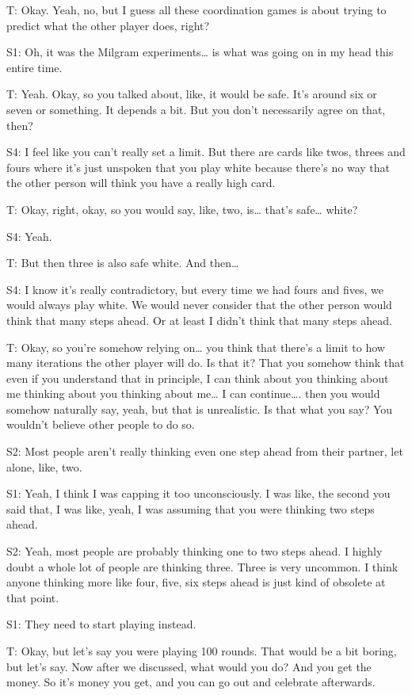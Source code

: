 T: Okay. Yeah, no, but I guess all these coordination games is about trying to predict what the other player does, right? 

S1: Oh, it was the Milgram experiments… is what was going on in my head this entire time.

T: Yeah. Okay, so you talked about, like, it would be safe. It's around six or seven or something. It depends a bit. But you don't necessarily agree on that, then?

S4: I feel like you can't really set a limit. But there are cards like twos, threes and fours where it's just unspoken that you play white because there's no way that the other person will think you have a really high card.

T: Okay, right, okay, so you would say, like, two, is… that's safe… white? 

S4: Yeah. 

T: But then three is also safe white. And then…

S4: I know it's really contradictory, but every time we had fours and fives, we would always play white. We would never consider that the other person would think that many steps ahead. Or at least I didn't think that many steps ahead. 

T:  Okay, so you're somehow relying on… you think that there's a limit to how many iterations the other player will do. Is that it? That you somehow think that even if you understand that in principle, I can think about you thinking about me thinking about you thinking about me… I can continue…. then you would somehow naturally say, yeah, but that is unrealistic. Is that what you say? You wouldn't believe other people to do so.

S2: Most people aren't really thinking even one step ahead from their partner, let alone, like, two. 

S1: Yeah, I think I was capping it too unconsciously. I was like, the second you said that, I was like, yeah, I was assuming that you were thinking two steps ahead.

S2: Yeah, most people are probably thinking one to two steps ahead. I highly doubt a whole lot of people are thinking three. Three is very uncommon. I think anyone thinking more like four, five, six steps ahead is just kind of obsolete at that point. 

S1: They need to start playing instead. 

T: Okay, but let's say you were playing 100 rounds. That would be a bit boring, but let's say. Now after we discussed, what would you do? And you get the money. So it's money you get, and you can go out and celebrate afterwards. 


